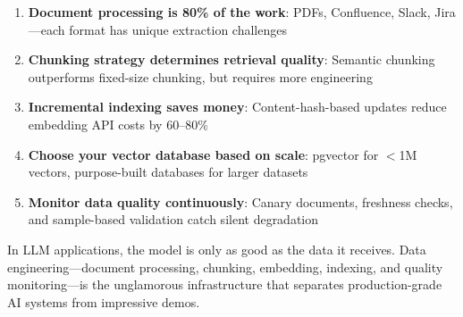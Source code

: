 \begin{enumerate}[leftmargin=*]
    \item \textbf{Document processing is 80\% of the work}: PDFs, Confluence, Slack, Jira---each format has unique extraction challenges
    \item \textbf{Chunking strategy determines retrieval quality}: Semantic chunking outperforms fixed-size chunking, but requires more engineering
    \item \textbf{Incremental indexing saves money}: Content-hash-based updates reduce embedding API costs by 60--80\%
    \item \textbf{Choose your vector database based on scale}: pgvector for $<$1M vectors, purpose-built databases for larger datasets
    \item \textbf{Monitor data quality continuously}: Canary documents, freshness checks, and sample-based validation catch silent degradation
\end{enumerate}

\begin{keytakeaway}
In LLM applications, the model is only as good as the data it receives. Data engineering---document processing, chunking, embedding, indexing, and quality monitoring---is the unglamorous infrastructure that separates production-grade AI systems from impressive demos.
\end{keytakeaway}
